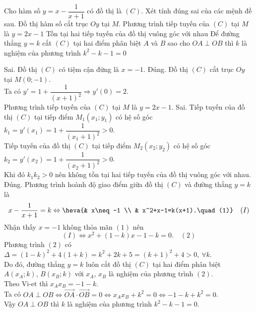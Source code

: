 \begin{ex}%
Cho hàm số $y=x-\dfrac{1}{x+1}$ có đồ thị là $(C)$. Xét tính đúng sai của các mệnh đề sau.
{\True Đồ thị hàm số cắt trục $Oy$ tại $M$. Phương trình tiếp tuyến của $(C)$ tại $M$ là $y=2x-1$}
{Tồn tại hai tiếp tuyến của đồ thị vuông góc với nhau}
{\True Để đường thẳng $y=k$ cắt $(C)$ tại hai điểm phân biệt $A$ và $B$ sao cho $OA\perp OB$ thì $k$ là nghiệm của phương trình $k^2-k-1=0$}
\loigiai
{\begin{itemchoice}
\itemch Sai. Đồ thị  $(C)$ có tiệm cận đứng là $x=-1$.
\itemch Đúng. Đồ thị $(C)$ cắt trục $Oy$ tại $M(0;-1)$.\\
Ta có $y'=1+\dfrac{1}{(x+1)^2}\Rightarrow y'(0)=2$.\\
Phương trình tiếp tuyến của $(C)$ tại $M$ là $y=2x-1$.
\itemch Sai. Tiếp tuyến của đồ thị $(C)$ tại tiếp điểm $M_1(x_1;y_1)$ có hệ số góc $k_1=y'\left(x_1\right)=1+\dfrac{1}{(x_1+1)^2}>0$.\\
Tiếp tuyến của đồ thị $(C)$ tại tiếp điểm $M_2(x_2;y_2)$ có hệ số góc $k_2=y'\left(x_2\right)=1+\dfrac{1}{(x_2+1)^2}>0$.\\
Khi đó $k_1k_2>0$ nên không tồn tại hai tiếp tuyến của đồ thị vuông góc với nhau.
\itemch Đúng. Phương trình hoành độ giao điểm giữa đồ thị $(C)$ và đường thẳng $y=k$ là $$x-\dfrac{1}{x+1}=k\Leftrightarrow\heva{& x\neq -1 \\ & x^2+x-1=k(x+1).\quad (1)}\quad (I)$$
Nhận thấy $x=-1$ không thỏa mãn $(1)$ nên $$(I)\Leftrightarrow x^2+(1-k)x-1-k=0.\quad (2)$$
Phương trình $(2)$ có $\Delta=(1-k)^2+4(1+k)=k^2+2k+5=(k+1)^2+4>0,\ \forall k$.\\
Do đó, đường thẳng $y=k$ luôn cắt đồ thị $(C)$ tại hai điểm phân biệt $A(x_A;k)$, $B(x_B;k)$ với $x_A$, $x_B$ là nghiệm của phương trình $(2)$.\\
Theo Vi-et thì $x_A x_B=-1-k$.\\
Ta có $OA\perp OB\Leftrightarrow\overrightarrow{OA}\cdot\overrightarrow{OB}=0\Leftrightarrow x_Ax_B+k^2=0\Leftrightarrow -1-k+k^2=0$.\\
Vậy $OA\perp OB$ thì $k$ là nghiệm của phương trình $k^2-k-1=0$.
\end{itemchoice}
}
\end{ex}

